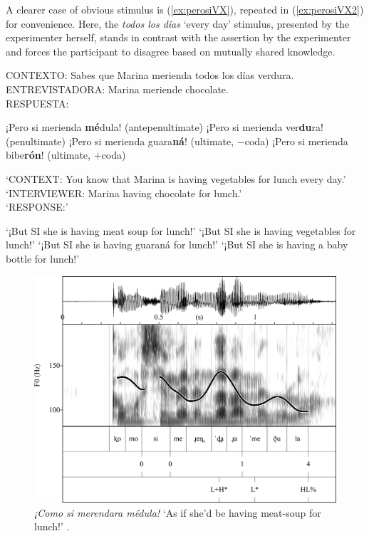 A clearer case of obvious stimulus is (\ref{ex:perosiVX}), repeated in (\ref{ex:perosiVX2}) for convenience. Here, the \textit{todos los días} `every day' stimulus, presented by the experimenter herself, stands in contrast with the assertion by the experimenter and forces the participant to disagree based on mutually shared knowledge.

\begin{exe}
	\ex  \label{ex:perosiVX2}  CONTEXTO: Sabes que Marina merienda todos los días verdura. \\
	ENTREVISTADORA: Marina meriende chocolate. \\
	RESPUESTA: 	
	\begin{xlist}
		\ex ¡Pero si merienda \textbf{mé}dula! (antepenultimate) 
		\ex ¡Pero si merienda ver\textbf{du}ra! (penultimate) 
		\ex ¡Pero si merienda guara\textbf{ná}! (ultimate, $-$coda)
		\ex ¡Pero si merienda bibe\textbf{rón}! (ultimate, $+$coda)  
	\end{xlist}
	
	\glt `CONTEXT: You know that Marina is having vegetables for lunch every day.' \\
	`INTERVIEWER: Marina having chocolate for lunch.' \\
	`RESPONSE:' 
	\begin{xlist}
		\ex `¡But SI she is having meat soup for lunch!' 
		\ex `¡But SI she is having vegetables for lunch!' 
		\ex `¡But SI she is having guaraná for lunch!' 
		\ex `¡But SI she is having a baby bottle for lunch!' 
	\end{xlist}
\end{exe}

\begin{figure}
	\includegraphics[width=\linewidth]{gfx/figure_como_si_187_ELVIRA_GARCIA_new.png}
	\caption{\textit{¡Como si merendara médula!} `As if she'd be having meat-soup for lunch!' 
		\citep[187]{ElviraGarcia.2016}.}\label{fig:comosiVsubFIGURE189}
\end{figure}

